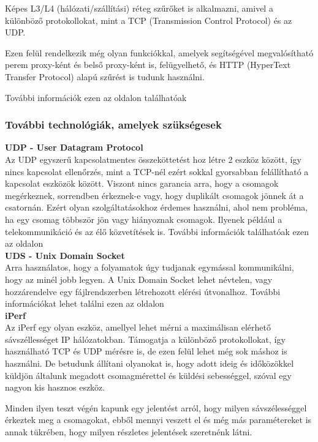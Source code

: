 \documentclass[a4paper,oneside]{article}
\begin{document}
Képes L3/L4 (hálózati/szállítási) réteg szűrőket is alkalmazni, amivel a 
különböző protokollokat, mint a TCP (Transmission Control Protocol) és az 
UDP. 

Ezen felül rendelkezik még olyan funkciókkal, amelyek segítségével 
megvalósítható perem proxy-ként és belső proxy-ként is, felügyelhető, 
és HTTP (HyperText Transfer Protocol) alapú szűrést is tudunk használni. 

További információk ezen az oldalon találhatóak ~\cite{envoydoc}

\subsubsection{További technológiák, amelyek szükségesek}
\textbf{UDP - User Datagram Protocol} \\
Az UDP egyszerű kapcsolatmentes összeköttetést hoz létre 2 eszköz 
között, így nincs kapcsolat ellenőrzés, mint a TCP-nél ezért sokkal 
gyorsabban felállítható a kapcsolat eszközök között. Viszont nincs 
garancia arra, hogy a csomagok megérkeznek, sorrendben érkeznek-e 
vagy, hogy duplikált csomagok jönnek át a csatornán. Ezért olyan 
szolgáltatásokhoz érdemes használni, ahol nem probléma, ha egy 
csomag többször jön vagy hiányoznak csomagok. Ilyenek például a 
telekommunikáció és az élő közvetítések is. További információk 
találhatóak ezen az oldalon ~\cite{udpwiki} \\

\textbf{UDS - Unix Domain Socket} \\ 
Arra használatos, hogy a folyamatok úgy tudjanak egymással kommunikálni, 
hogy az minél jobb legyen. A Unix Domain Socket lehet névtelen, vagy 
hozzárendelve egy fájlrendszerben létrehozott elérési útvonalhoz. 
További információkat lehet találni ezen az oldalon ~\cite{udsman} \\

\textbf{iPerf} \\ 
Az iPerf egy olyan eszköz, amellyel lehet mérni a maximálisan elérhető 
sávszéllességet IP hálózatokban. Támogatja a különböző protokollokat, így 
használható TCP és UDP mérésre is, de ezen felül lehet még sok máshoz is használni. 
De betudunk állítani olyanokat is, hogy adott ideig és időközökkel küldjön 
általunk megadott csomagmérettel és küldési sebességgel, szóval egy 
nagyon kis hasznos eszköz. 

Minden ilyen teszt végén kapunk egy jelentést arról, hogy milyen sávszélességgel 
érkeztek meg a csomagokat, ebből mennyi veszett el és még más paramétereket is 
annak tükrében, hogy milyen részletes jelentések szeretnénk látni. 
\end{document}
